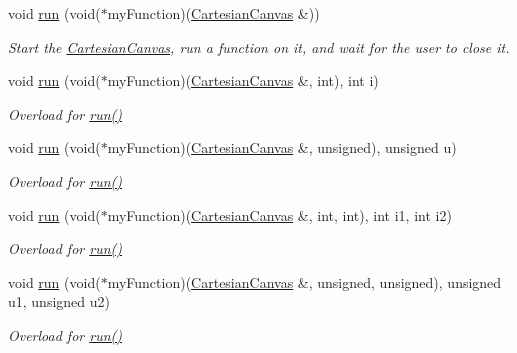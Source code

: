 \begin{DoxyCompactItemize}
void \hyperlink{classtsgl_1_1_cartesian_canvas_a63a948af53582b713957b872a765dcdb}{run} (void($\ast$my\+Function)(\hyperlink{classtsgl_1_1_cartesian_canvas}{Cartesian\+Canvas} \&))
\begin{DoxyCompactList}\small\item\em Start the \hyperlink{classtsgl_1_1_cartesian_canvas}{Cartesian\+Canvas}, run a function on it, and wait for the user to close it. \end{DoxyCompactList}\item 
void \hyperlink{classtsgl_1_1_cartesian_canvas_a4d50613e241cab83878aa4438f3db67e}{run} (void($\ast$my\+Function)(\hyperlink{classtsgl_1_1_cartesian_canvas}{Cartesian\+Canvas} \&, int), int i)
\begin{DoxyCompactList}\small\item\em Overload for \hyperlink{classtsgl_1_1_cartesian_canvas_a63a948af53582b713957b872a765dcdb}{run()} \end{DoxyCompactList}\item 
void \hyperlink{classtsgl_1_1_cartesian_canvas_ab18eee19a5a0c7011c4442b64d05f6cc}{run} (void($\ast$my\+Function)(\hyperlink{classtsgl_1_1_cartesian_canvas}{Cartesian\+Canvas} \&, unsigned), unsigned u)
\begin{DoxyCompactList}\small\item\em Overload for \hyperlink{classtsgl_1_1_cartesian_canvas_a63a948af53582b713957b872a765dcdb}{run()} \end{DoxyCompactList}\item 
void \hyperlink{classtsgl_1_1_cartesian_canvas_aae4be78e02055eed3e6e85bb39411f21}{run} (void($\ast$my\+Function)(\hyperlink{classtsgl_1_1_cartesian_canvas}{Cartesian\+Canvas} \&, int, int), int i1, int i2)
\begin{DoxyCompactList}\small\item\em Overload for \hyperlink{classtsgl_1_1_cartesian_canvas_a63a948af53582b713957b872a765dcdb}{run()} \end{DoxyCompactList}\item 
void \hyperlink{classtsgl_1_1_cartesian_canvas_a3351ccc624bb154dc910cafd9effe3cd}{run} (void($\ast$my\+Function)(\hyperlink{classtsgl_1_1_cartesian_canvas}{Cartesian\+Canvas} \&, unsigned, unsigned), unsigned u1, unsigned u2)
\begin{DoxyCompactList}\small\item\em Overload for \hyperlink{classtsgl_1_1_cartesian_canvas_a63a948af53582b713957b872a765dcdb}{run()} \end{DoxyCompactList}\item 

\end{DoxyCompactItemize}
